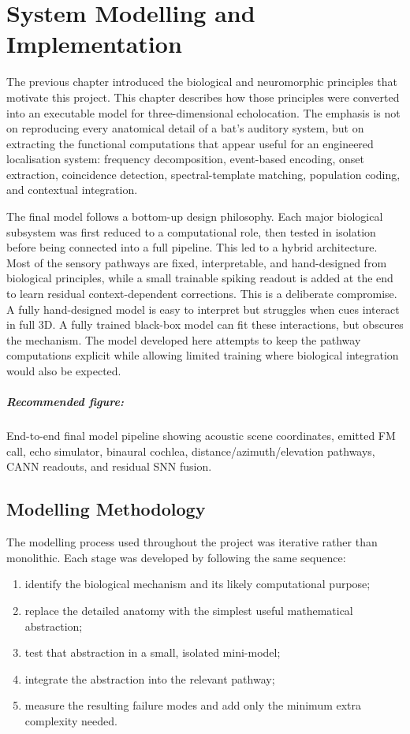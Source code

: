 \chapter{System Modelling and Implementation} \label{ch:modelling}

The previous chapter introduced the biological and neuromorphic principles that motivate this project. This chapter describes how those principles were converted into an executable model for three-dimensional echolocation. The emphasis is not on reproducing every anatomical detail of a bat's auditory system, but on extracting the functional computations that appear useful for an engineered localisation system: frequency decomposition, event-based encoding, onset extraction, coincidence detection, spectral-template matching, population coding, and contextual integration.

The final model follows a bottom-up design philosophy. Each major biological subsystem was first reduced to a computational role, then tested in isolation before being connected into a full pipeline. This led to a hybrid architecture. Most of the sensory pathways are fixed, interpretable, and hand-designed from biological principles, while a small trainable spiking readout is added at the end to learn residual context-dependent corrections. This is a deliberate compromise. A fully hand-designed model is easy to interpret but struggles when cues interact in full 3D. A fully trained black-box model can fit these interactions, but obscures the mechanism. The model developed here attempts to keep the pathway computations explicit while allowing limited training where biological integration would also be expected.

\paragraph{Recommended figure:} End-to-end final model pipeline showing acoustic scene coordinates, emitted FM call, echo simulator, binaural cochlea, distance/azimuth/elevation pathways, CANN readouts, and residual SNN fusion.

\section{Modelling Methodology}

The modelling process used throughout the project was iterative rather than monolithic. Each stage was developed by following the same sequence:
\begin{enumerate}
    \item identify the biological mechanism and its likely computational purpose;
    \item replace the detailed anatomy with the simplest useful mathematical abstraction;
    \item test that abstraction in a small, isolated mini-model;
    \item integrate the abstraction into the relevant pathway;
    \item measure the resulting failure modes and add only the minimum extra complexity needed.
\end{enumerate}

